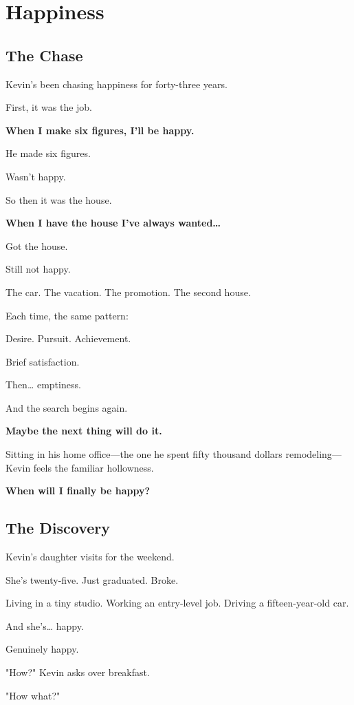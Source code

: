 \documentclass[11pt,twoside]{book}
\begin{document}
\chapter{Happiness}

\section*{The Chase}

Kevin's been chasing happiness for forty-three years.

First, it was the job.

\textbf{When I make six figures, I'll be happy.}

He made six figures.

Wasn't happy.

So then it was the house.

\textbf{When I have the house I've always wanted\ldots{}}

Got the house.

Still not happy.

The car. The vacation. The promotion. The second house.

Each time, the same pattern:

Desire. Pursuit. Achievement.

Brief satisfaction.

Then\ldots{} emptiness.

And the search begins again.

\textbf{Maybe the next thing will do it.}

Sitting in his home office—the one he spent fifty thousand dollars remodeling—Kevin feels the familiar hollowness.

\textbf{When will I finally be happy?}

\section*{The Discovery}

Kevin's daughter visits for the weekend.

She's twenty-five. Just graduated. Broke.

Living in a tiny studio. Working an entry-level job. Driving a fifteen-year-old car.

And she's\ldots{} happy.

Genuinely happy.

"How?" Kevin asks over breakfast.

"How what?"
\end{document}
